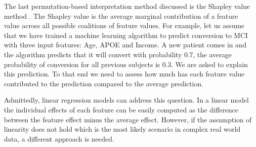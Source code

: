 \documentclass[preprint,12pt]{elsarticle}
\begin{document}


The last permutation-based interpretation method discussed is the Shapley value method \cite{shapley1953value}. The Shapley value is the average marginal contribution of a feature value across all possible coalitions of feature values. For example, let us assume that we have trained a machine learning algorithm to predict conversion to MCI with three input features: Age, APOE and Income. A new patient comes in and the algorithm predicts that it will convert with probability  0.7, the average probability of conversion for all previous subjects is 0.3.
We are asked to explain this prediction. To that end we need to assess how much has each feature value contributed to the prediction compared to the average prediction. 

Admittedly, linear regression models can address this question. In a linear model the individual effects of each feature can be easily computed as the difference between the feature effect minus the average effect. However, if the assumption of linearity does not hold which is the most likely scenario in complex real world data, a different approach is needed. 
\end{document}
